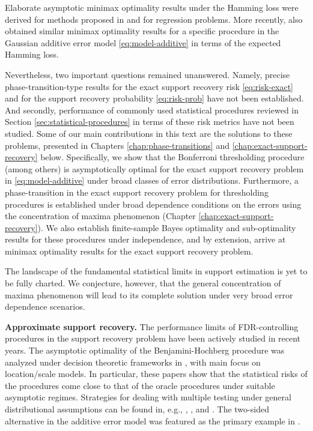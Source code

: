 Elaborate asymptotic minimax optimality results under the Hamming loss were derived for methods proposed in \cite{ji2012ups} and \cite{jin2014optimality} for regression problems.
More recently, \cite{butucea2018variable} also obtained similar minimax optimality results for a specific procedure in the Gaussian additive error model \eqref{eq:model-additive} in terms of the expected Hamming loss.

Nevertheless, two important questions remained unanswered.
Namely, precise phase-transition-type results for the exact support recovery risk 
\eqref{eq:risk-exact} and for the support recovery probability \eqref{eq:risk-prob} 
have not been established.
And secondly, performance of commonly used statistical procedures reviewed in Section \ref{sec:statistical-procedures}
in terms of these risk metrics have not been studied.
Some of our main contributions in this text are the solutions to these problems, presented in Chapters \ref{chap:phase-transitions} and \ref{chap:exact-support-recovery} below. 
Specifically, we show that the Bonferroni thresholding procedure (among others) is asymptotically optimal for the exact support recovery problem in \eqref{eq:model-additive} under broad classes of error distributions. 
Furthermore, a phase-transition in the exact support recovery problem for thresholding procedures is established under broad dependence conditions on the errors using the concentration of maxima phenomenon (Chapter \ref{chap:exact-support-recovery}). 
We also establish finite-sample Bayes optimality and sub-optimality results for these procedures under independence, and by extension, arrive at minimax optimality results for the exact support recovery problem. 

The landscape of the fundamental statistical limits in support estimation is yet to be fully charted. 
We conjecture, however, that the general concentration of maxima phenomenon will lead to its complete solution under very broad error 
dependence scenarios.
\medskip

{\bf Approximate support recovery.}
The performance limits of FDR-controlling procedures in the support recovery problem have been actively studied in recent years.
The asymptotic optimality of the Benjamini-Hochberg procedure
was analyzed under decision theoretic frameworks in \cite{genovese2002operating, bogdan2011asymptotic, neuvial2012false}, with main focus on location/scale models. 
In particular, these papers show that the statistical risks of the procedures come close to that of the oracle procedures under suitable asymptotic regimes.
Strategies for dealing with multiple testing under general distributional assumptions can be found in, e.g., \cite{efron2004large}, \cite{storey2007optimal}, and \cite{sun2007oracle}.
The two-sided alternative in the additive error model was featured as the primary example in \cite{sun2007oracle}.

